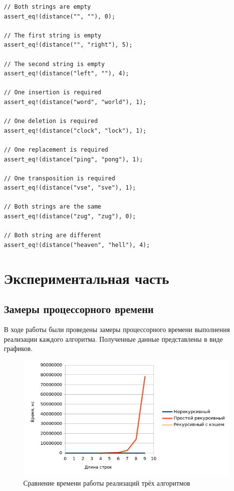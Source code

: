 \documentclass{report}
\begin{document}
\begin{lstlisting}[caption=Тесты реализаций алгоритмов поиска
    $\Delta_{\textup{ДЛ}}$]
// Both strings are empty
assert_eq!(distance("", ""), 0);

// The first string is empty
assert_eq!(distance("", "right"), 5);

// The second string is empty
assert_eq!(distance("left", ""), 4);

// One insertion is required
assert_eq!(distance("word", "world"), 1);

// One deletion is required
assert_eq!(distance("clock", "lock"), 1);

// One replacement is required
assert_eq!(distance("ping", "pong"), 1);

// One transposition is required
assert_eq!(distance("vse", "sve"), 1);

// Both strings are the same
assert_eq!(distance("zug", "zug"), 0);

// Both string are different
assert_eq!(distance("heaven", "hell"), 4);
\end{lstlisting}

\chapter{Экспериментальная часть}

\section{Замеры процессорного времени}

В ходе работы были проведены замеры процессорного времени
выполнения реализации каждого алгоритма. Полученные данные
представлены в виде графиков.

\begin{figure}[ht]
    \centering
    \includegraphics[width=\textwidth]{plt-01.png}
    \caption{Сравнение времени работы реализаций трёх алгоритмов}
\end{figure}
\end{document}
